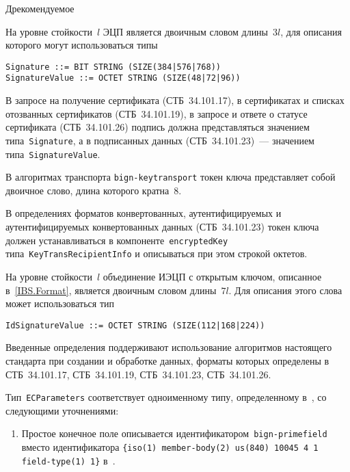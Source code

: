 \begin{appendix}{Д}{рекомендуемое}

\label{ASN.Sign}

На уровне стойкости~$l$ ЭЦП является двоичным словом длины~$3l$,
для описания которого могут использоваться типы
\begin{verbatim}
Signature ::= BIT STRING (SIZE(384|576|768))
SignatureValue ::= OCTET STRING (SIZE(48|72|96))
\end{verbatim}

В запросе на получение сертификата (СТБ~34.101.17),
в сертификатах и списках отозванных сертификатов (СТБ~34.101.19),
в запросе и ответе о статусе сертификата (СТБ~34.101.26)
подпись должна представляться значением типа~\texttt{Signature}, 
а в подписанных данных (СТБ~34.101.23)~---
значением типа~\texttt{SignatureValue}.

\label{ASN.Token}

В алгоритмах транспорта \texttt{bign-keytransport}
токен ключа представляет собой двоичное слово, 
длина которого кратна~$8$.

В  определениях форматов конвертованных, аутентифицируемых 
и аутентифицируемых конвертованных данных (СТБ~34.101.23)
токен ключа должен устанавливаться 
в компоненте~\texttt{encryptedKey} типа~\texttt{KeyTransRecipientInfo}
и описываться при этом строкой октетов.

\label{ASN.IBS}

На уровне стойкости~$l$ объединение ИЭЦП с открытым ключом,
описанное в~\ref{IBS.Format}, является двоичным словом длины~$7l$.
Для описания этого слова может использоваться тип
\begin{verbatim}
IdSignatureValue ::= OCTET STRING (SIZE(112|168|224))
\end{verbatim}

\label{ASN.Compat}

Введенные определения поддерживают использование алгоритмов 
настоящего стандарта при создании и обработке данных, 
форматы которых определены в СТБ~34.101.17, СТБ~34.101.19, 
СТБ~34.101.23, СТБ~34.101.26.

Тип~\texttt{ECParameters} соответствует одноименному типу,
определенному в~\cite{ANSI9.62}, со следующими уточнениями:
\begin{enumerate}
\item
Простое конечное поле описывается идентификатором~\texttt{bign-primefield} 
вместо  идентификатора \texttt{\{iso(1) member-body(2) us(840) 10045 
4 1 field-type(1) 1\}} в~\cite{ANSI9.62}.


\end{enumerate}
\end{appendix}
